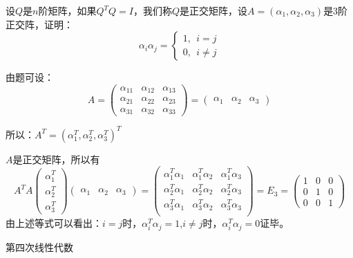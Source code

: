 \documentclass[a4paper]{report}
\begin{document}
\EX 设$Q$是$n$阶矩阵，如果$Q^TQ=I$，我们称$Q$是正交矩阵，设$A=(\alpha_1,\alpha_2,\alpha_3)$是3阶正交阵，证明：
\begin{equation*}
\alpha_i\alpha_j=
\begin{cases}
1,~~i=j\\
0,~~i\neq j
\end{cases}
\end{equation*}

\begin{zhengming}
由题可设：
\begin{equation*}
A=
\begin{pmatrix}
\alpha_{11}&\alpha_{12}&\alpha_{13}\\
\alpha_{21}&\alpha_{22}&\alpha_{23}\\
\alpha_{31}&\alpha_{32}&\alpha_{33}
\end{pmatrix}=
\begin{pmatrix}
\alpha_1&\alpha_2&\alpha_3
\end{pmatrix}
\end{equation*}

所以：$A^T=(\alpha_1^T,\alpha_2^T,\alpha_3^T)^T$

$A$是正交矩阵，所以有
\begin{equation*}A^TA
\begin{pmatrix}
\alpha_1^T\\ \alpha_2^T\\ \alpha_3^T
\end{pmatrix}\begin{pmatrix}
\alpha_1&\alpha_2&\alpha_3
\end{pmatrix}=
\begin{pmatrix}
\alpha_1^T\alpha_1&\alpha_1^T\alpha_2&\alpha_1^T\alpha_3\\
\alpha_2^T\alpha_1&\alpha_2^T\alpha_2&\alpha_2^T\alpha_3\\
\alpha_3^T\alpha_1&\alpha_3^T\alpha_2&\alpha_3^T\alpha_3\\
\end{pmatrix}=E_3=
\begin{pmatrix}
1&0&0\\
0&1&0\\
0&0&1
\end{pmatrix}
\end{equation*}
由上述等式可以看出：$i=j$时，$\alpha_i^T\alpha_j=1$,$i\neq j$时，$\alpha_i^T\alpha_j=0$证毕。
\end{zhengming}


\clearpage
\hphantom{~~}\hfill {\heiti 第四次线性代数} \hfill\hphantom{~~}
\end{document}
